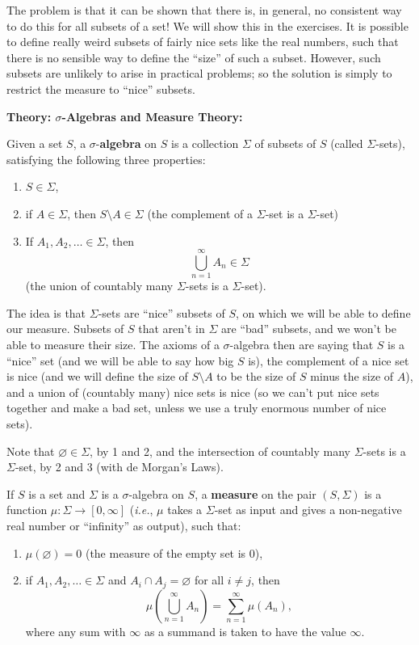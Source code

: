 \documentclass{article}
\let\take\setminus
\begin{document}
The problem is that it can be shown that there is, in general, no consistent way to do this for all subsets of a set! We will show this in the exercises. It is possible to define really weird subsets of fairly nice sets like the real numbers, such that there is no sensible way to define the ``size'' of such a subset. However, such subsets are unlikely to arise in practical problems; so the solution is simply to restrict the measure to ``nice'' subsets.



\clearpage












\textbf{Theory: $\sigma$-Algebras and Measure Theory:}\bigskip


Given a set $S$, a $\sigma$-\textbf{algebra} on $S$ is a collection $\Sigma$ of subsets of $S$ (called $\Sigma$-sets), satisfying the following three properties:
\begin{enumerate}
	\item $S\in \Sigma$,
	\item if $A\in \Sigma$, then $S\take A\in \Sigma$ (the complement of a $\Sigma$-set is a $\Sigma$-set)
	\item If $A_1,A_2,\hdots\in\Sigma$, then
		\[\bigcup_{n=1}^\infty A_n \in \Sigma\]
		(the union of countably many $\Sigma$-sets is a $\Sigma$-set).
\end{enumerate}

The idea is that $\Sigma$-sets are ``nice'' subsets of $S$, on which we will be able to define our measure. Subsets of $S$ that aren't in $\Sigma$ are ``bad'' subsets, and we won't be able to measure their size. The axioms of a $\sigma$-algebra then are saying that $S$ is a ``nice'' set (and we will be able to say how big $S$ is), the complement of a nice set is nice (and we will define the size of $S\take A$ to be the size of $S$ minus the size of $A$), and a union of (countably many) nice sets is nice (so we can't put nice sets together and make a bad set, unless we use a truly enormous number of nice sets).

Note that $\varnothing\in \Sigma$, by 1 and 2, and the intersection of countably many $\Sigma$-sets is a $\Sigma$-set, by 2 and 3 (with de Morgan's Laws).\bigskip


If $S$ is a set and $\Sigma$ is a $\sigma$-algebra on $S$, a \textbf{measure} on the pair $(S,\Sigma)$ is a function $\mu:\Sigma \to [0,\infty]$ (\textit{i.e.}, $\mu$ takes a $\Sigma$-set as input and gives a non-negative real number or ``infinity'' as output), such that:
\begin{enumerate}
	\item $\mu(\varnothing)=0$ (the measure of the empty set is 0),
	\item if $A_1,A_2,\hdots\in\Sigma$ and $A_i\cap A_j=\varnothing$ for all $i\neq j$, then
		\[\mu\left(\bigcup_{n=1}^\infty A_n\right) = \sum_{n=1}^\infty \mu\left(A_n\right),\]
		where any sum with $\infty$ as a summand is taken to have the value $\infty$.
\end{enumerate}
\end{document}
